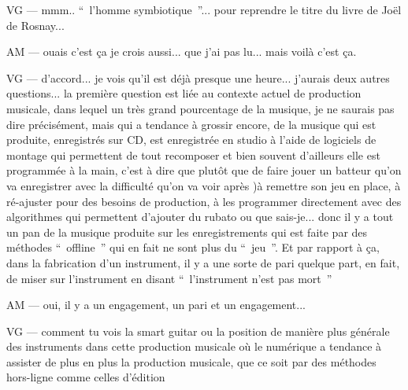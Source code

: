 VG — mmm.. “ l'homme symbiotique ”... pour reprendre le titre du livre de Joël de Rosnay... 

AM — ouais c'est ça je crois aussi... que j'ai pas lu... mais voilà c'est ça.

VG — d'accord... je vois qu'il est déjà presque une heure... j'aurais deux autres questions... la première question est liée au contexte actuel de production musicale, dans lequel un très grand pourcentage de la musique, je ne saurais pas dire précisément, mais qui a tendance à grossir encore, de la musique qui est produite, enregistrés sur CD, est enregistrée en studio à l'aide de logiciels de montage qui permettent de tout recomposer et bien souvent d'ailleurs elle est programmée à la main, c'est à dire que plutôt que de faire jouer un batteur qu'on va enregistrer avec la difficulté qu'on va voir après )à remettre son jeu en place, à ré-ajuster pour des besoins de production, à les programmer directement avec des algorithmes qui permettent d'ajouter du rubato ou que sais-je... donc il y a tout un pan de la musique produite sur les enregistrements qui est faite par des méthodes “ offline ” qui en fait ne sont plus du “ jeu ”.  Et par rapport à ça, dans la fabrication d'un instrument, il y a une sorte de pari quelque part, en fait, de miser sur l'instrument en disant “ l'instrument n'est pas mort ” 

AM — oui, il y a un engagement, un pari et un engagement... 

VG — comment tu vois la smart guitar ou la position de manière plus générale des instruments dans cette production musicale où le numérique a tendance à assister de plus en plus la production musicale, que ce soit par des méthodes hors-ligne comme celles d'édition

